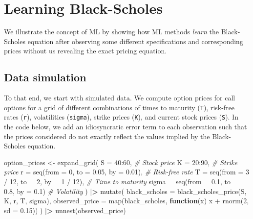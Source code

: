 \documentclass[
]{book}
\newenvironment{Shaded}{\begin{snugshade}}{\end{snugshade}}
\newcommand{\AttributeTok}[1]{\textcolor[rgb]{0.61,0.61,0.61}{#1}}
\newcommand{\CommentTok}[1]{\textcolor[rgb]{0.37,0.37,0.37}{\textit{#1}}}
\newcommand{\ControlFlowTok}[1]{\textcolor[rgb]{0.27,0.27,0.27}{\textbf{#1}}}
\newcommand{\DecValTok}[1]{\textcolor[rgb]{0.06,0.06,0.06}{#1}}
\newcommand{\ErrorTok}[1]{\textcolor[rgb]{0.14,0.14,0.14}{\textbf{#1}}}
\newcommand{\FloatTok}[1]{\textcolor[rgb]{0.06,0.06,0.06}{#1}}
\newcommand{\FunctionTok}[1]{\textcolor[rgb]{0,0,0}{#1}}
\newcommand{\NormalTok}[1]{#1}
\newcommand{\OtherTok}[1]{\textcolor[rgb]{0.37,0.37,0.37}{#1}}
\newcommand{\SpecialCharTok}[1]{\textcolor[rgb]{0,0,0}{#1}}
\begin{document}
\hypertarget{learning-black-scholes}{%
\section{Learning Black-Scholes}\label{learning-black-scholes}}

We illustrate the concept of ML by showing how ML methods \emph{learn} the Black-Scholes equation after observing some different specifications and corresponding prices without us revealing the exact pricing equation.

\hypertarget{data-simulation}{%
\subsection{Data simulation}\label{data-simulation}}

To that end, we start with simulated data. We compute option prices for call options for a grid of different combinations of times to maturity (\texttt{T}), risk-free rates (\texttt{r}), volatilities (\texttt{sigma}), strike prices (\texttt{K}), and current stock prices (\texttt{S}). In the code below, we add an idiosyncratic error term to each observation such that the prices considered do not exactly reflect the values implied by the Black-Scholes equation.

\begin{Shaded}
\begin{Highlighting}[]
\NormalTok{option\_prices }\OtherTok{\textless{}{-}} \FunctionTok{expand\_grid}\NormalTok{(}
  \AttributeTok{S =} \DecValTok{40}\SpecialCharTok{:}\DecValTok{60}\NormalTok{, }\CommentTok{\# Stock price}
  \AttributeTok{K =} \DecValTok{20}\SpecialCharTok{:}\DecValTok{90}\NormalTok{, }\CommentTok{\# Strike price}
  \AttributeTok{r =} \FunctionTok{seq}\NormalTok{(}\AttributeTok{from =} \DecValTok{0}\NormalTok{, }\AttributeTok{to =} \FloatTok{0.05}\NormalTok{, }\AttributeTok{by =} \FloatTok{0.01}\NormalTok{), }\CommentTok{\# Risk{-}free rate}
  \AttributeTok{T =} \FunctionTok{seq}\NormalTok{(}\AttributeTok{from =} \DecValTok{3} \SpecialCharTok{/} \DecValTok{12}\NormalTok{, }\AttributeTok{to =} \DecValTok{2}\NormalTok{, }\AttributeTok{by =} \DecValTok{1} \SpecialCharTok{/} \DecValTok{12}\NormalTok{), }\CommentTok{\# Time to maturity}
  \AttributeTok{sigma =} \FunctionTok{seq}\NormalTok{(}\AttributeTok{from =} \FloatTok{0.1}\NormalTok{, }\AttributeTok{to =} \FloatTok{0.8}\NormalTok{, }\AttributeTok{by =} \FloatTok{0.1}\NormalTok{) }\CommentTok{\# Volatility}
\NormalTok{) }\SpecialCharTok{|}\ErrorTok{\textgreater{}}
  \FunctionTok{mutate}\NormalTok{(}
    \AttributeTok{black\_scholes =} \FunctionTok{black\_scholes\_price}\NormalTok{(S, K, r, T, sigma),}
    \AttributeTok{observed\_price =} \FunctionTok{map}\NormalTok{(black\_scholes, }
                         \ControlFlowTok{function}\NormalTok{(x) x }\SpecialCharTok{+} \FunctionTok{rnorm}\NormalTok{(}\DecValTok{2}\NormalTok{, }\AttributeTok{sd =} \FloatTok{0.15}\NormalTok{))}
\NormalTok{  ) }\SpecialCharTok{|}\ErrorTok{\textgreater{}}
  \FunctionTok{unnest}\NormalTok{(observed\_price)}
\end{Highlighting}
\end{Shaded}
\end{document}
